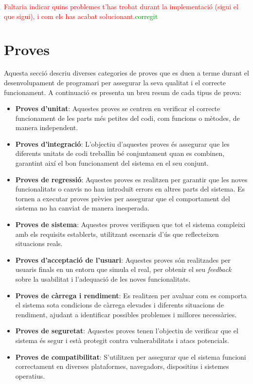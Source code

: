 \documentclass[a4paper,12pt,twoside]{ThesisStyle}
\newcommand{\pau}[1]{\textcolor{red}{#1}}
\newcommand{\sudan}[1]{\textcolor{green}{#1}}
\begin{document}
\pau{Faltaria indicar quins problemes t'has trobat durant la implementació (sigui el que sigui), i com els has acabat solucionant.}\sudan{corregit}


\section{Proves}
\label{sec: Proves}

Aquesta secció descriu diverses categories de proves que es duen a terme durant el desenvolupament de programari per assegurar la seva qualitat i el correcte funcionament. A continuació es presenta un breu resum de cada tipus de prova:

\begin{itemize}
\item \textbf{Proves d'unitat}: Aquestes proves se centren en verificar el correcte funcionament de les parts més petites del codi, com funcions o mètodes, de manera independent.
\item \textbf{Proves d'integració}: L'objectiu d'aquestes proves és assegurar que les diferents unitats de codi treballin bé conjuntament quan es combinen, garantint així el bon funcionament del sistema en el seu conjunt.
\item \textbf{Proves de regressió}: Aquestes proves es realitzen per garantir que les noves funcionalitats o canvis no han introduït errors en altres parts del sistema. Es tornen a executar proves prèvies per assegurar que el comportament del sistema no ha canviat de manera inesperada.
\item \textbf{Proves de sistema}: Aquestes proves verifiquen que tot el sistema compleixi amb els requisits establerts, utilitzant escenaris d'ús que reflecteixen situacions reals.
\item \textbf{Proves d'acceptació de l'usuari}: Aquestes proves són realitzades per usuaris finals en un entorn que simula el real, per obtenir el seu \textit{feedback} sobre la usabilitat i l'adequació de les noves funcionalitats.
\item \textbf{Proves de càrrega i rendiment}: Es realitzen per avaluar com es comporta el sistema sota condicions de càrrega elevades i diferents situacions de rendiment, ajudant a identificar possibles problemes i millores necessàries.
\item \textbf{Proves de seguretat}: Aquestes proves tenen l'objectiu de verificar que el sistema és segur i està protegit contra vulnerabilitats i atacs potencials.
\item \textbf{Proves de compatibilitat}: S'utilitzen per assegurar que el sistema funcioni correctament en diverses plataformes, navegadors, dispositius i sistemes operatius.
\end{itemize}
\end{document}

